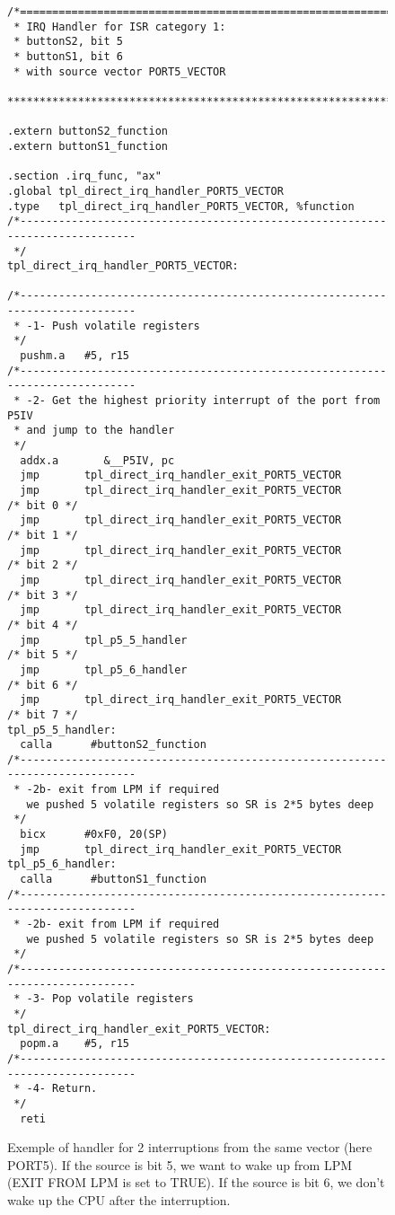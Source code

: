\documentclass[11pt, oneside]{article}
\begin{document}
\begin{figure}
\caption{Exemple of handler for 2 interruptions from the same vector (here PORT5). If the source is bit 5, we want to wake up from LPM (EXIT FROM LPM is set to TRUE). If the source is bit 6, we don't wake up the CPU after the interruption.}
\begin{lstlisting}
/*=============================================================================
 * IRQ Handler for ISR category 1:
 * buttonS2, bit 5
 * buttonS1, bit 6
 * with source vector PORT5_VECTOR
 ******************************************************************************/

.extern buttonS2_function
.extern buttonS1_function

.section .irq_func, "ax"
.global tpl_direct_irq_handler_PORT5_VECTOR
.type   tpl_direct_irq_handler_PORT5_VECTOR, %function
/*-----------------------------------------------------------------------------
 */
tpl_direct_irq_handler_PORT5_VECTOR:

/*-----------------------------------------------------------------------------
 * -1- Push volatile registers
 */
  pushm.a   #5, r15
/*-----------------------------------------------------------------------------
 * -2- Get the highest priority interrupt of the port from P5IV 
 * and jump to the handler
 */
  addx.a       &__P5IV, pc
  jmp       tpl_direct_irq_handler_exit_PORT5_VECTOR
  jmp       tpl_direct_irq_handler_exit_PORT5_VECTOR       /* bit 0 */
  jmp       tpl_direct_irq_handler_exit_PORT5_VECTOR       /* bit 1 */
  jmp       tpl_direct_irq_handler_exit_PORT5_VECTOR       /* bit 2 */
  jmp       tpl_direct_irq_handler_exit_PORT5_VECTOR       /* bit 3 */
  jmp       tpl_direct_irq_handler_exit_PORT5_VECTOR       /* bit 4 */
  jmp       tpl_p5_5_handler                               /* bit 5 */
  jmp       tpl_p5_6_handler                               /* bit 6 */
  jmp       tpl_direct_irq_handler_exit_PORT5_VECTOR       /* bit 7 */
tpl_p5_5_handler:
  calla      #buttonS2_function
/*-----------------------------------------------------------------------------
 * -2b- exit from LPM if required
   we pushed 5 volatile registers so SR is 2*5 bytes deep
 */
  bicx      #0xF0, 20(SP)
  jmp       tpl_direct_irq_handler_exit_PORT5_VECTOR
tpl_p5_6_handler:
  calla      #buttonS1_function
/*-----------------------------------------------------------------------------
 * -2b- exit from LPM if required
   we pushed 5 volatile registers so SR is 2*5 bytes deep
 */
/*-----------------------------------------------------------------------------
 * -3- Pop volatile registers
 */
tpl_direct_irq_handler_exit_PORT5_VECTOR:
  popm.a    #5, r15 
/*-----------------------------------------------------------------------------
 * -4- Return.
 */
  reti
\end{lstlisting}
\label{Handler ISR1 Port5}
\end{figure}
\end{document}
